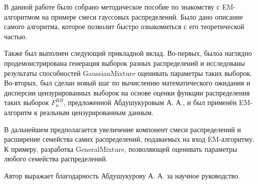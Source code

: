     В данной работе было собрано методическое пособие по знакомству с EM-алгоритмом на примере смеси гауссовых распределений. Было дано описание самого алгоритма, которое позволит быстро ознакомиться с его теоретической частью.
    
    Также был выполнен следующий прикладной вклад. Во-первых, былоа наглядно продемонстрирована генерация выборок разных распределений и исследованы результаты способностей GaussianMixture оценивать параметры таких выборок. Во-вторых, был сделан новый шаг по вычислению математического ожидания и дисперсии цензурированных выборок на основе оценки функции распределения таких выборок $F_n^{RR}$, предложенной Абдушукуровым А. А., и был применён EM-алгоритм к реальным цензурированным данным.
    
    В дальнейшем предполагается увеличение компонент смеси распределений и расширение семейства самих распределений, подаваемых на вход EM-алгоритму. К примеру, разработка GeneralMixture, позволяющей оценивать параметры любого семейства распределений.
    
    Автор выражает благодарность Абдушукурову А. А. за научное руководство.